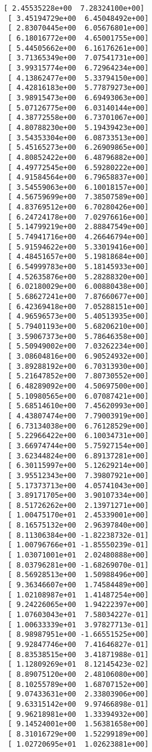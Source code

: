 \documentclass[11pt]{article}
\begin{document}
\begin{Verbatim}[commandchars=\\\{\}]
 [ 2.45535228e+00  7.28324100e+00]
 [ 3.45194729e+00  6.45048492e+00]
 [ 2.83070445e+00  6.05676801e+00]
 [ 6.18016772e+00  4.65001755e+00]
 [ 5.44505662e+00  6.16176261e+00]
 [ 3.71365349e+00  7.07541731e+00]
 [ 3.99315774e+00  6.72964234e+00]
 [ 4.13862477e+00  5.33794150e+00]
 [ 4.42816183e+00  5.77879273e+00]
 [ 3.98915473e+00  6.69493063e+00]
 [ 5.07126775e+00  6.03140144e+00]
 [ 4.38772558e+00  6.73701067e+00]
 [ 4.80788230e+00  5.19439423e+00]
 [ 3.54353304e+00  6.08733513e+00]
 [ 5.45165273e+00  6.26909865e+00]
 [ 4.80852422e+00  6.48796882e+00]
 [ 4.49772545e+00  6.59280222e+00]
 [ 4.91584564e+00  6.79658837e+00]
 [ 3.54559063e+00  6.10018157e+00]
 [ 4.56759699e+00  7.38507589e+00]
 [ 4.83769512e+00  6.70280426e+00]
 [ 6.24724178e+00  7.02976616e+00]
 [ 5.14799219e+00  2.88847549e+00]
 [ 5.74941716e+00  4.26646794e+00]
 [ 5.91594622e+00  5.33019416e+00]
 [ 4.48451657e+00  5.19818684e+00]
 [ 6.54999783e+00  5.18145933e+00]
 [ 4.52635876e+00  5.28288320e+00]
 [ 6.02180029e+00  6.00880438e+00]
 [ 5.68627241e+00  7.87660677e+00]
 [ 6.42369418e+00  7.05288151e+00]
 [ 4.96596573e+00  5.40513935e+00]
 [ 5.79401193e+00  5.68206210e+00]
 [ 3.59067373e+00  5.78646358e+00]
 [ 5.50949002e+00  7.03262234e+00]
 [ 3.08604816e+00  6.90524932e+00]
 [ 3.89288192e+00  6.70313930e+00]
 [ 5.21647852e+00  7.80730552e+00]
 [ 6.48289092e+00  4.50697500e+00]
 [ 5.10980565e+00  6.07087421e+00]
 [ 5.68514610e+00  7.45620993e+00]
 [ 4.43807474e+00  7.79003919e+00]
 [ 6.73134038e+00  6.76128529e+00]
 [ 5.22966422e+00  6.10034731e+00]
 [ 3.66974744e+00  5.75927154e+00]
 [ 3.62344824e+00  6.89137281e+00]
 [ 6.30115997e+00  5.12629214e+00]
 [ 3.95512343e+00  7.39807921e+00]
 [ 5.17373713e+00  4.05741043e+00]
 [ 3.89171705e+00  3.90107334e+00]
 [ 8.51726262e+00  2.13971271e+00]
 [ 1.00475170e+01  2.45339001e+00]
 [ 8.16575132e+00  2.96397840e+00]
 [ 8.11306384e+00 -1.82238732e-01]
 [ 1.00796766e+01 -1.85550239e-01]
 [ 1.03071001e+01  2.02480888e+00]
 [ 8.03796281e+00 -1.68269070e-01]
 [ 8.56928513e+00  1.50988496e+00]
 [ 9.36346607e+00  1.74584489e+00]
 [ 1.02108987e+01  1.41487254e+00]
 [ 9.24226065e+00  1.94222397e+00]
 [ 1.07603043e+01  7.58034227e-01]
 [ 1.00633339e+01  3.97827713e-01]
 [ 8.98987951e+00 -1.66551525e+00]
 [ 9.92847746e+00  7.41646827e-01]
 [ 8.83538515e+00  3.41871988e-01]
 [ 1.12809269e+01  8.12145423e-02]
 [ 8.89075120e+00  2.48106080e+00]
 [ 8.10255789e+00  1.68707152e+00]
 [ 9.07433631e+00  2.33803906e+00]
 [ 9.63315142e+00  9.97466898e-01]
 [ 9.96218981e+00  1.33394932e+00]
 [ 9.14524001e+00  1.56381658e+00]
 [ 8.31016729e+00  1.52299189e+00]
 [ 1.02720695e+01  1.02623881e+00]

\end{Verbatim}
\end{document}
